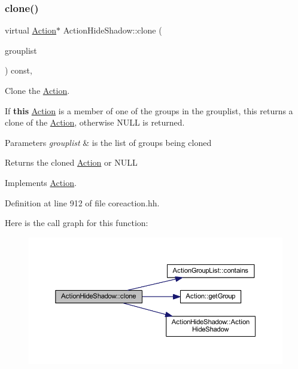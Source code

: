 \subsubsection{\texorpdfstring{clone()}{clone()}}
{\footnotesize\ttfamily virtual \mbox{\hyperlink{class_action}{Action}}$\ast$ Action\+Hide\+Shadow\+::clone (\begin{DoxyParamCaption}\item[{const \mbox{\hyperlink{class_action_group_list}{Action\+Group\+List}} \&}]{grouplist }\end{DoxyParamCaption}) const\hspace{0.3cm}{\ttfamily [inline]}, {\ttfamily [virtual]}}



Clone the \mbox{\hyperlink{class_action}{Action}}. 

If {\bfseries{this}} \mbox{\hyperlink{class_action}{Action}} is a member of one of the groups in the grouplist, this returns a clone of the \mbox{\hyperlink{class_action}{Action}}, otherwise N\+U\+LL is returned. 
\begin{DoxyParams}{Parameters}
{\em grouplist} & is the list of groups being cloned \\
\hline
\end{DoxyParams}
\begin{DoxyReturn}{Returns}
the cloned \mbox{\hyperlink{class_action}{Action}} or N\+U\+LL 
\end{DoxyReturn}


Implements \mbox{\hyperlink{class_action_af8242e41d09e5df52f97df9e65cc626f}{Action}}.



Definition at line 912 of file coreaction.\+hh.

Here is the call graph for this function\+:
\nopagebreak
\begin{figure}[H]
\begin{center}
\leavevmode
\includegraphics[width=350pt]{class_action_hide_shadow_a5b763cb14e0381b879231c4922d00f5b_cgraph}
\end{center}
\end{figure}



